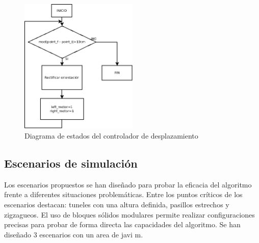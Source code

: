 \begin{figure}[h]
		\centering
        \includegraphics[width=0.5\textwidth]{images/flujoavance.png}
        \caption{Diagrama de estados del controlador de desplazamiento}
        \label{fig:flujoavance}
\end{figure} 

\subsection{Escenarios de simulación}

Los escenarios propuestos se han diseñado para probar la eficacia del algoritmo frente a diferentes situaciones problemáticas. Entre los puntos críticos de los escenarios destacan: tuneles con una altura definida, pasillos estrechos y zigzagueos. El uso de bloques sólidos modulares permite realizar configuraciones precisas para probar de forma directa las capacidades del algoritmo. Se han diseñado 3 escenarios con un area de javi m.


